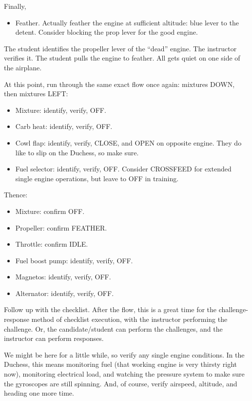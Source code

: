 Finally,

\begin{itemize}
    \item Feather. Actually feather the engine at sufficient altitude: blue lever to the detent. Consider blocking the prop lever for the good engine.
\end{itemize}

The student identifies the propeller lever of the ``dead'' engine. The instructor verifies it. The student pulls the engine to feather. All gets quiet on one side of the airplane.

At this point, run through the same exact flow once again: mixtures DOWN, then mixtures LEFT:

\begin{itemize}
    \item Mixture: identify, verify, OFF.
    \item Carb heat: identify, verify, OFF.
    \item Cowl flap: identify, verify, CLOSE, and OPEN on opposite engine. They do like to slip on the Duchess, so make sure.
    \item Fuel selector: identify, verify, OFF. Consider CROSSFEED for extended single engine operations, but leave to OFF in training.
\end{itemize}

Thence:

\begin{itemize}
    \item Mixture: confirm OFF.
    \item Propeller: confirm FEATHER.
    \item Throttle: confirm IDLE.
    \item Fuel boost pump: identify, verify, OFF.
    \item Magnetos: identify, verify, OFF.
    \item Alternator: identify, verify, OFF.
\end{itemize}

Follow up with the checklist. After the flow, this is a great time for the challenge-response method of checklist execution, with the
instructor performing the challenge. Or, the candidate/student can perform the challenges, and the instructor can perform responses.

We might be here for a little while, so verify any single engine conditions. In the Duchess, this means monitoring fuel (that working engine is very thirsty right now), monitoring electrical load, and watching the pressure system to make sure the gyroscopes are still spinning. And, of course, verify airspeed, altitude, and heading one more time.

